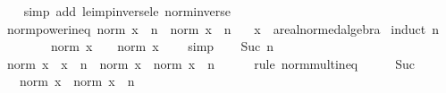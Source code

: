 \begin{isabellebody}
%
\isadelimproof
\ \ %
\endisadelimproof
%
\isatagproof
{}\isamarkupfalse%
\ {\isacharparenleft}{\kern0pt}simp\ add{\isacharcolon}{\kern0pt}\ le{\isacharunderscore}{\kern0pt}imp{\isacharunderscore}{\kern0pt}inverse{\isacharunderscore}{\kern0pt}le\ norm{\isacharunderscore}{\kern0pt}inverse{\isacharparenright}{\kern0pt}%
\endisatagproof
{\isafoldproof}%
%
\isadelimproof
\isanewline
%
\endisadelimproof
\isanewline
{}\isamarkupfalse%
\ norm{\isacharunderscore}{\kern0pt}power{\isacharunderscore}{\kern0pt}ineq{\isacharcolon}{\kern0pt}\ {\isachardoublequoteopen}norm\ {\isacharparenleft}{\kern0pt}x\ {\isacharcircum}{\kern0pt}\ n{\isacharparenright}{\kern0pt}\ {\isasymle}\ norm\ x\ {\isacharcircum}{\kern0pt}\ n{\isachardoublequoteclose}\isanewline
\ \ \ x\ {\isacharcolon}{\kern0pt}{\isacharcolon}{\kern0pt}\ {\isachardoublequoteopen}{\isacharprime}{\kern0pt}a{\isacharcolon}{\kern0pt}{\isacharcolon}{\kern0pt}real{\isacharunderscore}{\kern0pt}normed{\isacharunderscore}{\kern0pt}algebra{\isacharunderscore}{\kern0pt}{}{\isachardoublequoteclose}\isanewline
%
\isadelimproof
%
\endisadelimproof
%
\isatagproof
{}\isamarkupfalse%
\ {\isacharparenleft}{\kern0pt}induct\ n{\isacharparenright}{\kern0pt}\isanewline
\ \ \isamarkupfalse%
\ {}\isanewline
\ \ \isamarkupfalse%
\ {\isachardoublequoteopen}norm\ {\isacharparenleft}{\kern0pt}x\ {\isacharcircum}{\kern0pt}\ {}{\isacharparenright}{\kern0pt}\ {\isasymle}\ norm\ x\ {\isacharcircum}{\kern0pt}\ {}{\isachardoublequoteclose}\ \isamarkupfalse%
\ simp\isanewline
{}\isamarkupfalse%
\isanewline
\ \ \isamarkupfalse%
\ {\isacharparenleft}{\kern0pt}Suc\ n{\isacharparenright}{\kern0pt}\isanewline
\ \ \isamarkupfalse%
\ {\isachardoublequoteopen}norm\ {\isacharparenleft}{\kern0pt}x\ {\isacharasterisk}{\kern0pt}\ x\ {\isacharcircum}{\kern0pt}\ n{\isacharparenright}{\kern0pt}\ {\isasymle}\ norm\ x\ {\isacharasterisk}{\kern0pt}\ norm\ {\isacharparenleft}{\kern0pt}x\ {\isacharcircum}{\kern0pt}\ n{\isacharparenright}{\kern0pt}{\isachardoublequoteclose}\isanewline
\ \ \ \ \isamarkupfalse%
\ {\isacharparenleft}{\kern0pt}rule\ norm{\isacharunderscore}{\kern0pt}mult{\isacharunderscore}{\kern0pt}ineq{\isacharparenright}{\kern0pt}\isanewline
\ \ \isamarkupfalse%
\ \isamarkupfalse%
\ Suc\ \isamarkupfalse%
\ {\isachardoublequoteopen}{\isasymdots}\ {\isasymle}\ norm\ x\ {\isacharasterisk}{\kern0pt}\ norm\ x\ {\isacharcircum}{\kern0pt}\ n{\isachardoublequoteclose}\isanewline

\end{isabellebody}
